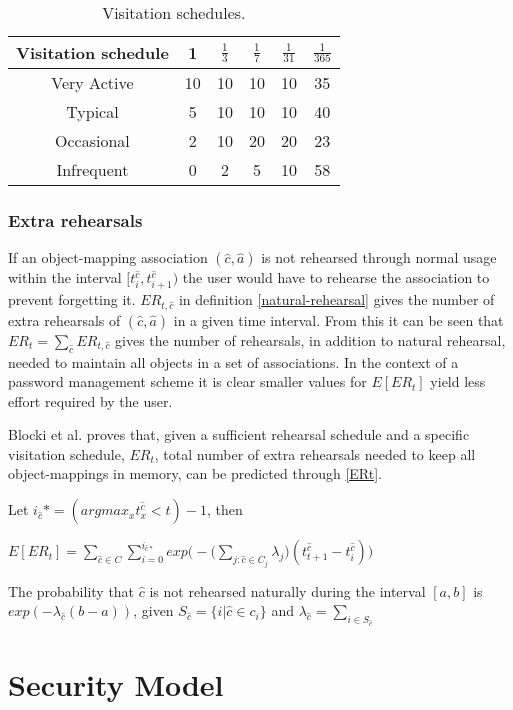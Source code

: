 \begin{table}
\begin{tabular}{|c||c|c|c|c|c|}
    \hline
    Visitation schedule & 1 & $\frac{1}{3}$ & $\frac{1}{7}$ & $\frac{1}{31}$ & $\frac{1}{365}$ \\
    \hline \hline
    Very Active & 10 &10 &10 &10 & 35 \\
    \hline
    Typical & 5 & 10 & 10 & 10 & 40 \\
    \hline
    Occasional & 2 & 10 & 20 & 20 & 23 \\
    \hline
    Infrequent & 0 & 2 & 5 & 10 &  58 \\
    \hline
\end{tabular}
\caption{Visitation schedules.}
\label{users}
\end{table}

\subsubsection{Extra rehearsals}
If an object-mapping association $(\hat c, \hat a)$ is not rehearsed through normal usage within the interval $[t^{\hat c}_i, t^{\hat c}_{i+1})$ the user would have to rehearse the association to prevent forgetting it. $ER_{t,\hat c}$ in definition \ref{natural-rehearsal} gives the number of extra rehearsals of $(\hat c, \hat a)$ in a given time interval. From this it can be seen that $ER_t = \sum_{\hat c} ER_{t, \hat c}$ gives the number of rehearsals, in addition to natural rehearsal, needed to maintain all objects in a set of associations. In the context of a password management scheme it is clear smaller values for $E[ER_t]$ yield less effort required by the user.
\par Blocki et al.\cite{naturally-rehearsing} proves that, given a sufficient rehearsal schedule  and a specific visitation schedule, $ER_t$, total number of extra rehearsals needed to keep all object-mappings in memory, can be predicted through \autoref{ERt}. 


\begin{theorem}\label{ERt}
    \cite{naturally-rehearsing} Let $i_{\hat c}* = (arg max_x t^{\hat c}_x < t)- 1 $, then 

    $ E[ER_t] = \sum_{\hat c \in C} \sum^{i_{\hat c *}}_{i=0} exp\bigg(-\bigg(\sum\limits_{j:\hat c \in C_j} \lambda_j \bigg)(t^{\hat c}_{t+1} - t^{\hat c}_i)\bigg)$
\end{theorem}

\begin{lemma}
    \cite{naturally-rehearsing} The probability that $\hat c$ is not rehearsed naturally during the interval $[a,b]$ is $exp(-\lambda_{\hat c} (b-a))$, given $S_{\hat c} = \{i \vert \hat c \in c_i \}$ and $\lambda_{\hat c}= \sum_{i \in S_{\hat c}}$
\end{lemma}


\section{Security Model}

\cite{naturally-rehearsing}











